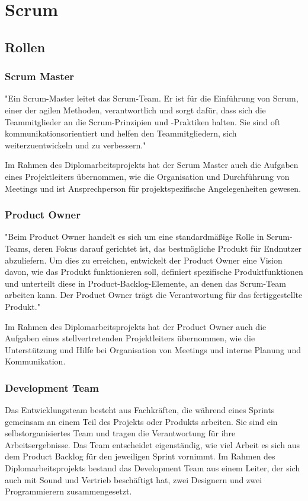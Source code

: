 
\section{Scrum}\label{sec:scrum}

\renewcommand{\kapitelautor}{Autor: Nils Hubmann} %

\subsection{Rollen}\label{subsec:rollen}

%
\subsubsection{Scrum Master}\label{subsubsec:Scrum-Master}
%
"Ein Scrum-Master leitet das Scrum-Team.
Er ist für die Einführung von Scrum, einer der agilen Methoden, verantwortlich und sorgt dafür, dass sich die Teammitglieder an die Scrum-Prinzipien und -Praktiken halten.
Sie sind oft kommunikationsorientiert und helfen den Teammitgliedern, sich weiterzuentwickeln und zu verbessern."

Im Rahmen des Diplomarbeitsprojekts hat der Scrum Master auch die Aufgaben eines Projektleiters übernommen, wie die Organisation und Durchführung von Meetings und ist Ansprechperson für projektspezifische Angelegenheiten gewesen.

%
\subsubsection{Product Owner}\label{subsubsec:Product-Owner}
%
"Beim Product Owner handelt es sich um eine standardmäßige Rolle in Scrum-Teams, deren Fokus darauf gerichtet ist, das bestmögliche Produkt für Endnutzer abzuliefern.
Um dies zu erreichen, entwickelt der Product Owner eine Vision davon, wie das Produkt funktionieren soll, definiert spezifische Produktfunktionen und unterteilt diese in Product-Backlog-Elemente, an denen das Scrum-Team arbeiten kann.
Der Product Owner trägt die Verantwortung für das fertiggestellte Produkt."

Im Rahmen des Diplomarbeitsprojekts hat der Product Owner auch die Aufgaben eines stellvertretenden Projektleiters übernommen, wie die Unterstützung und Hilfe bei Organisation von Meetings und interne Planung und Kommunikation.
%
\subsubsection{Development Team}\label{subsubsec:Development-Team}
%
Das Entwicklungsteam besteht aus Fachkräften, die während eines Sprints gemeinsam an einem Teil des Projekts oder Produkts arbeiten.
Sie sind ein selbstorganisiertes Team und tragen die Verantwortung für ihre Arbeitsergebnisse.
Das Team entscheidet eigenständig, wie viel Arbeit es sich aus dem Product Backlog für den jeweiligen Sprint vornimmt.
Im Rahmen des Diplomarbeitsprojekts bestand das Development Team aus einem Leiter, der sich auch mit Sound und Vertrieb beschäftigt hat, zwei Designern und zwei Programmierern zusammengesetzt.
%
